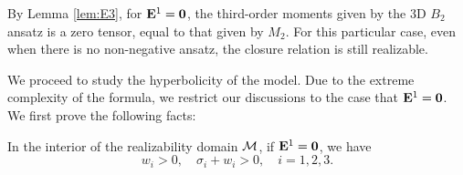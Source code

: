 \begin{remark}
  By Lemma \ref{lem:E3}, for $\mathbf{E}^1=\boldsymbol{0}$, the third-order
  moments given by the 3D $B_2$ ansatz is a zero tensor, equal to that given by
  $M_2$. For this particular case, even when there is no non-negative ansatz, 
  the closure relation is still realizable.
\end{remark}

We proceed to study the hyperbolicity of the model. Due to the extreme
complexity of the formula, we restrict our discussions to the case that
$\mathbf{E}^1 = \boldsymbol{0}$. We first prove the following facts:
\begin{lemma}\label{lem:fact-bound-sigma-w}
  In the interior of the realizability domain ${\mathcal M}$, if
  $\mathbf{E}^1 = \boldsymbol{0}$, we have
  \[
  w_i > 0,\quad \sigma_i + w_i > 0,\quad i = 1,2,3.
  \]
\end{lemma}
